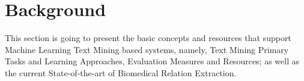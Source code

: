 \documentclass[11pt]{article}
\begin{document}

\hypertarget{2}{\section{Background}}


This section is going to present the basic concepts and resources that support Machine Learning Text Mining based systems, namely, Text Mining Primary Tasks and Learning Approaches, Evaluation Measures and Resources; as well as the current State-of-the-art of Biomedical Relation Extraction. 





\end{document}
